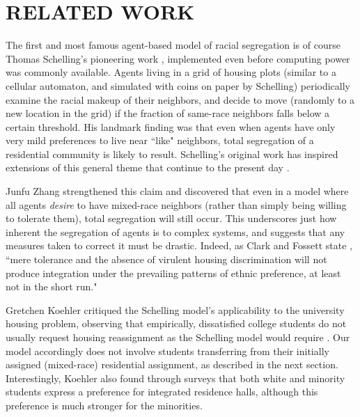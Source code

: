 
\section{RELATED WORK}
\label{sec:related}

The first and most famous agent-based model of racial segregation is of course
Thomas Schelling's pioneering work \cite{schelling_models_1969}, implemented
even before computing power was commonly available. Agents living in a grid of
housing plots (similar to a cellular automaton, and simulated with coins on
paper by Schelling) periodically examine the racial makeup of their neighbors,
and decide to move (randomly to a new location in the grid) if the fraction of
same-race neighbors falls below a certain threshold. His landmark finding was
that even when agents have only very mild preferences to live near ``like"
neighbors, total segregation of a residential community is likely to result.
Schelling's original work has inspired extensions of this general theme that
continue to the present day \cite[to name just a
few]{laurie_role_2003,chen_emergence_2005,collard_emergence_2013,pate_segregation_2010,yin_dynamics_2009,fossett_overlooked_2005,abbas_agent-based_2013,bischi_adaptive_2011}.

Junfu Zhang \citeyear{zhang_evolutionary_2002} strengthened this claim and
discovered that even in a model where all agents \textit{desire} to have
mixed-race neighbors (rather than simply being willing to tolerate them),
total segregation will still occur. This underscores just how inherent the
segregation of agents is to complex systems, and suggests that any measures
taken to correct it must be drastic. Indeed, as Clark and Fossett state
\citeyear{clark_understanding_2008}, ``mere tolerance and the absence of
virulent housing discrimination will not produce integration under the
prevailing patterns of ethnic preference, at least not in the short run."

Gretchen Koehler \citeyear{koehler_racial_2001} critiqued the Schelling
model's applicability to the university housing problem, observing that
empirically, dissatisfied college students do not usually request housing
reassignment as the Schelling model would require
\cite{koehler_residential_2010}. Our model accordingly does not involve
students transferring from their initially assigned (mixed-race) residential
assignment, as described in the next section. Interestingly, Koehler also
found through surveys that both white and minority students express a
preference for integrated residence halls, although this preference is much
stronger for the minorities.

